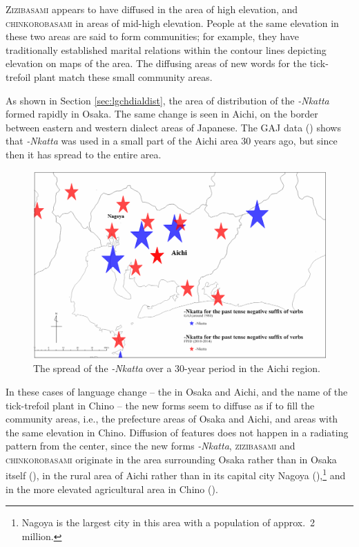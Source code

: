 \documentclass[output=paper]{LSP/langsci}
\begin{document}
\textsc{Zizibasami} appears to have diffused in the area of high elevation, and \textsc{chinkorobasami} in areas of mid-high elevation. People at the same elevation in these two areas are said to form communities; for example, they have traditionally established marital relations within the contour lines depicting elevation on maps of the area. The diffusing areas of new words for the tick-trefoil plant match these small community areas.

As shown in Section \ref{sec:lgchdialdist}, the area of distribution of the  \textit{-Nkatta} formed rapidly in Osaka. The same change is seen in Aichi, on the border between eastern and western dialect areas of Japanese. The GAJ data () shows that \textit{-Nkatta} was used in a small part of the Aichi area 30 years ago, but since then it has spread to the entire area.

\begin{figure}
\includegraphics[height=.4\textheight]{illustrations/onishi_fig6}
\caption{The spread of the  \textit{-Nkatta} over a 30-year period in the Aichi region.}
\label{fig:6}
\end{figure}
In these cases of language change -- the  in Osaka and Aichi, and the name of the tick-trefoil plant in Chino -- the new forms seem to diffuse as if to fill the community areas, i.e., the prefecture areas of Osaka and Aichi, and areas with the same elevation in Chino. Diffusion of features does not happen in a radiating pattern from the center, since the new forms \textit{-Nkatta}, \textsc{zizibasami} and \textsc{chinkorobasami} originate in the area surrounding Osaka rather than in Osaka itself (), in the rural area of Aichi rather than in its capital city Nagoya (),\footnote{ Nagoya is the largest city in this area with a population of approx.\ 2 million.} and in the more elevated agricultural area in Chino ().
\end{document}
